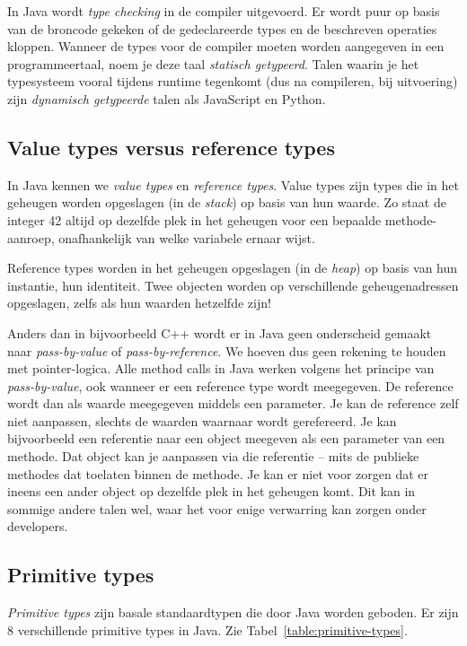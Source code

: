 \documentclass[dutch,a4paper,12pt,doubleside]{book}
\begin{document}
In Java wordt \textit{type checking} in de compiler uitgevoerd. Er wordt 
puur op basis van de broncode gekeken of de gedeclareerde types en de beschreven 
operaties kloppen. Wanneer de types voor de compiler moeten worden aangegeven in 
een programmeertaal, noem je deze taal \textit{statisch getypeerd}. Talen waarin 
je het typesysteem vooral tijdens runtime tegenkomt (dus na compileren, bij uitvoering) 
zijn \textit{dynamisch getypeerde} talen als JavaScript en Python.

\subsection{Value types versus reference types}
In Java kennen we \textit{value types} en \textit{reference types}.
Value types zijn types die in het geheugen worden opgeslagen (in de \textit{stack}) 
op basis van hun waarde. 
Zo staat de integer 42 altijd op dezelfde plek in het geheugen voor een bepaalde 
methode-aanroep, onafhankelijk van welke variabele ernaar wijst. 

Reference types worden in het geheugen opgeslagen (in de \textit{heap}) 
op basis van hun instantie, hun identiteit.
Twee objecten worden op verschillende geheugenadressen opgeslagen, zelfs als hun 
waarden hetzelfde zijn!

Anders dan in bijvoorbeeld C++ wordt er in Java geen onderscheid gemaakt naar 
\textit{pass-by-value} of \textit{pass-by-reference}. We hoeven dus geen rekening 
te houden met pointer-logica. Alle method calls in Java werken 
volgens het principe van \textit{pass-by-value}, ook wanneer er een reference
type wordt meegegeven. De reference wordt dan als waarde meegegeven middels een
parameter. Je kan de reference zelf niet aanpassen, slechts de waarden waarnaar 
wordt gerefereerd. Je kan bijvoorbeeld een referentie naar een object meegeven 
als een parameter van een methode. 
Dat object kan je aanpassen via die referentie -- mits de publieke methodes dat toelaten binnen 
de methode. Je kan er niet voor zorgen dat er ineens een ander object op dezelfde plek in 
het geheugen komt. Dit kan in sommige andere talen wel, 
waar het voor enige verwarring kan zorgen onder developers.

\subsection{Primitive types}
\textit{Primitive types} zijn basale standaardtypen die door Java worden geboden.
Er zijn 8 verschillende primitive types in Java.
Zie Tabel~\ref{table:primitive-types}. 
\end{document}

